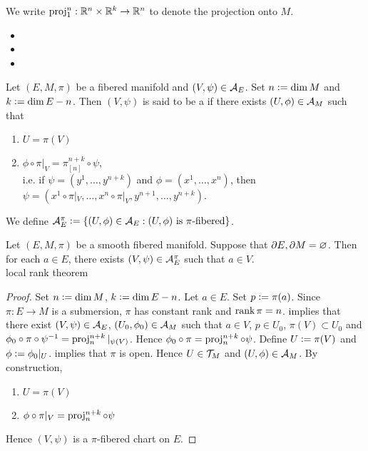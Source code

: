 \documentclass{book}
\begin{document}
\begin{note}
	We write $\operatorname{\text{proj}}^n_1: \mathbb{R}^n \times \mathbb{R}^k \rightarrow \mathbb{R}^n$ to denote the projection onto $M$.
\end{note}

\begin{itemize}
	\item {}
	\item {}
	\item {}
\end{itemize}

\begin{defn} 
	Let $(E, M, \pi)$ be a fibered manifold and $(V, \psi) \in \mathcal{A}_{E}$. Set $n \vcentcolon= \dim M$ and $k \vcentcolon= \dim E - n$. Then $(V, \psi)$ is said to be a  if there exists $(U, \phi) \in \mathcal{A}_{M}$ such that 
	\begin{enumerate}
		\item $U = \pi(V)$
		\item $\phi \circ \pi|_V = \pi^{n+k}_{[n]} \circ \psi$, \\
		i.e. if $\psi = (y^1, \ldots, y^{n+k})$ and $\phi = (x^1, \ldots, x^n)$, then $\psi = (x^1 \circ \pi|_V, \ldots, x^n \circ \pi|_V, y^{n+1}, \ldots, y^{n+k})$.
	\end{enumerate}
	We define $\mathcal{A}_E^{\pi} \vcentcolon= \{(U, \phi) \in \mathcal{A}_E: \text{$(U, \phi)$ is $\pi$-fibered} \}$.
\end{defn}

\begin{ex} 
	Let $(E, M, \pi)$ be a smooth fibered manifold. Suppose that $\partial E, \partial M = \varnothing$. Then for each $a \in E$, there exists $(V, \psi) \in \mathcal{A}_E^{\pi}$ such that $a \in V$. \\
	 local rank theorem 
\end{ex}

\begin{proof}
	Set $n \vcentcolon= \dim M$, $k \vcentcolon= \dim E - n$. Let $a \in E$. Set $p \vcentcolon= \pi(a)$. Since $\pi:E \rightarrow M$ is a submersion, $\pi$ has constant rank and $\operatorname{\text{rank}} \pi = n$.  implies that there exist $(V, \psi) \in \mathcal{A}_E$, $(U_0, \phi_0) \in \mathcal{A}_M$ such that $a \in V$, $p \in U_0$, $\pi(V) \subset U_0$ and $\phi_0 \circ \pi \circ \psi^{-1} = \operatorname{\text{proj}}^{n+k}_n|_{\psi(V)}$. Hence $\phi_0 \circ \pi = \operatorname{\text{proj}}^{n+k}_n \circ \psi $. Define $U \vcentcolon= \pi(V)$ and $\phi \vcentcolon= \phi_0|_U$.  implies that $\pi$ is open. Hence $U \in \mathcal{T}_M$ and $(U, \phi) \in \mathcal{A}_M$.
	By construction, 
	\begin{enumerate}
		\item 
		$U = \pi(V)$
		\item 
		$\phi \circ \pi|_V = \operatorname{\text{proj}}^{n+k}_n \circ \psi$
	\end{enumerate}
	Hence $(V, \psi)$ is a $\pi$-fibered chart on $E$. 
\end{proof}
\end{document}
